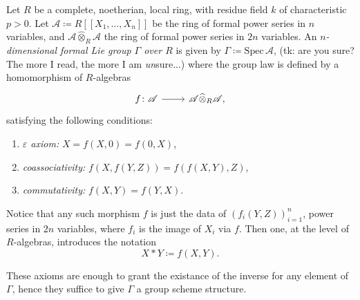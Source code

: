 \documentclass[../Main]{subfiles}
\begin{document}
\begin{defn}
	Let $R$ be a complete, noetherian, local ring,
	with residue field $k$ of characteristic $p > 0$.
	Let $\mathscr{A} \coloneqq R [\![ X_1, \ldots, X_{ n } ]\!]$
	be the ring of formal power series in $n$ variables,
	and $\mathscr{A} \widehat{\otimes}_R \mathscr{A}$ the ring of formal power series 
	in $2n$ variables.
	An {\em $n$-dimensional formal Lie group $\Gamma$ over $R$} is 
	given by $\Gamma \coloneqq \mathrm{Spec}\, \mathscr{A}$,
	(tk: are you sure? The more I read, the more I am {\em un}sure...)
	where the group law is defined by a homomorphism of $R$-algebras 
	\begin{equation*}
	\begin{tikzcd}[row sep = 0ex
		,/tikz/column 1/.append style={anchor=base east}
		,/tikz/column 2/.append style={anchor=base west}]
		f\colon \mathscr{A} \arrow[r, "", rightarrow] &
		\mathscr{A} \widehat{\otimes}_R \mathscr{A}
	,\end{tikzcd}
	\end{equation*} 
	satisfying the following conditions:
	\begin{enumerate}
		\item {\em $\varepsilon$ axiom:} $X = f(X,0) = f(0,X)$,
		\item {\em coassociativity:} $f(X, f(Y,Z)) = f(f(X,Y), Z)$,
		\item {\em commutativity:} $f(X,Y) = f(Y,X)$.
	\end{enumerate}
	Notice that any such morphism $f$ is just the data of 
	$\left( f_i(Y,Z) \right)_{i=1}^n$, power series in $2n$ variables, where
	$f_i$ is the image of $X_i$ via $f$.
	Then one, at the level of $R$-algebras, introduces the notation
	\begin{equation*}
		X \ast Y \coloneqq f(X,Y)
	.\end{equation*} 
\end{defn}

\begin{rem}[]
	These axioms are enough to grant the existance of the inverse for any element of $\Gamma$,
	hence they suffice to give $\Gamma$ a group scheme structure.
\end{rem}
\end{document}
